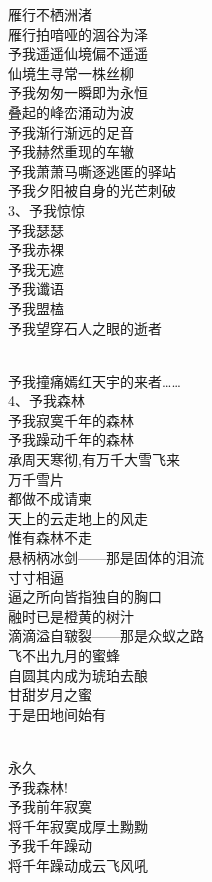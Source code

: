 \documentclass{article}
\begin{document}
雁行不栖洲渚
\\
雁行拍喑哑的涸谷为泽 \\ 


予我遥遥仙境偏不遥遥\\
仙境生寻常一株丝柳\\
予我匆匆一瞬即为永恒
\\
叠起的峰峦涌动为波 \\ 


予我渐行渐远的足音\\
予我赫然重现的车辙\\
予我萧萧马嘶逐逃匿的驿站
\\
予我夕阳被自身的光芒刺破 \\ 


3、予我惊惊\\
予我瑟瑟\\
予我赤裸\\
予我无遮\\
予我谶语
\\
予我盟榼 \\ 


予我望穿石人之眼的逝者
\newpage

\\
予我撞痛嫣红天宇的来者…… \\ 


4、予我森林\\
予我寂寞千年的森林
\\
予我躁动千年的森林 \\ 


承周天寒彻,有万千大雪飞来\\
万千雪片\\
都做不成请柬\\
天上的云走地上的风走\\
惟有森林不走\\
悬柄柄冰剑——那是固体的泪流\\
寸寸相逼
\\
逼之所向皆指独自的胸口 \\ 


融时已是橙黄的树汁\\
滴滴溢自皲裂——那是众蚁之路\\
飞不出九月的蜜蜂\\
自圆其内成为琥珀去酿\\
甘甜岁月之蜜\\
于是田地间始有
\newpage

\\
永久 \\ 


予我森林!\\
予我前年寂寞\\
将千年寂寞成厚土黝黝\\
予我千年躁动
\\
将千年躁动成云飞风吼 \\ 
\end{document}
